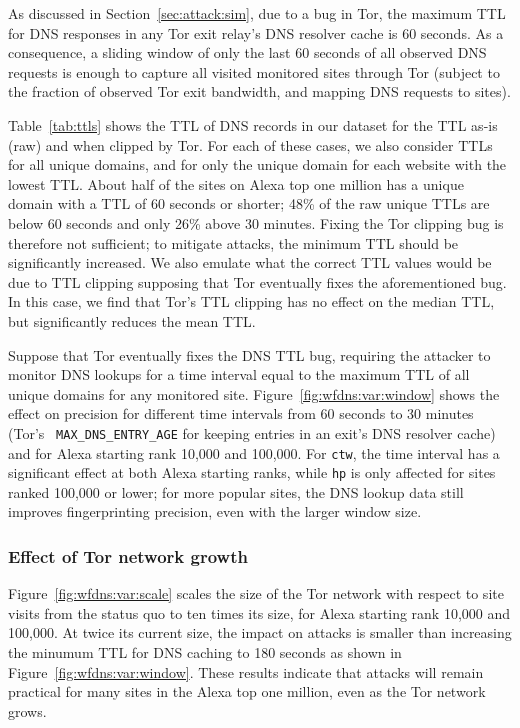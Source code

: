 As discussed in Section~\ref{sec:attack:sim}, due to a bug in Tor, the
maximum TTL for DNS responses in any Tor exit relay's DNS resolver cache
is 60 seconds. As a consequence, a sliding window of only the last 60
seconds of all observed DNS requests is enough to capture all visited
monitored sites through Tor (subject to the fraction of observed Tor
exit bandwidth, and mapping DNS requests to sites).

Table~\ref{tab:ttls} shows the TTL of DNS records in our dataset for the
TTL as-is (raw) and when clipped by Tor.  For each of these cases, we
also consider TTLs for all unique domains, and for only the unique
domain for each website with the lowest TTL.  About half of the sites on
Alexa top one million has a unique domain with a TTL of 60 seconds or
shorter; 48\% of the raw unique TTLs are below 60 seconds and only 26\%
above 30 minutes. Fixing the Tor clipping bug is therefore not
sufficient; to mitigate \name attacks, the minimum TTL should be 
significantly increased.  We also emulate what the correct TTL values
would be due to TTL clipping supposing that Tor eventually fixes the
aforementioned bug.  In this case, we find that Tor's TTL clipping has
no effect on the median TTL, but significantly reduces the mean TTL.

Suppose that Tor eventually fixes the DNS TTL bug, requiring the
attacker to monitor DNS lookups for a time interval equal to the maximum
TTL of all unique domains for any monitored site.
Figure~\ref{fig:wfdns:var:window} shows the effect on precision for
different time intervals from 60 seconds to 30 minutes (Tor's {\tt
  MAX\_DNS\_ENTRY\_AGE} for keeping entries in an exit's DNS resolver
cache) and for Alexa starting rank 10,000 and 100,000. For \texttt{ctw},
the time interval has a significant effect at both Alexa starting ranks,
while \texttt{hp} is only affected for sites ranked 100,000 or lower;
for more popular sites, the DNS lookup data still improves
fingerprinting precision, even with the larger window size.

\subsubsection{Effect of Tor network growth}
Figure~\ref{fig:wfdns:var:scale} scales the size of the Tor network with
respect to site
visits from the status quo to ten times its size, for Alexa starting rank 10,000 and
100,000. At twice its current size, the impact on \name attacks is smaller than
increasing the minumum TTL for DNS caching to 180 seconds as shown in
Figure~\ref{fig:wfdns:var:window}. These results indicate that \name
attacks will remain
practical for many sites in the Alexa top one million, even as the Tor network grows.

